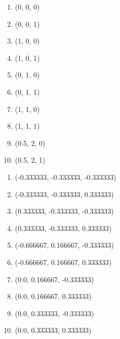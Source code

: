 \documentclass[10pt]{report}
\begin{document}
\begin{center}
    \begin{enumerate}[v]
        \item (0, 0, 0)
        \item (0, 0, 1)
        \item (1, 0, 0)
        \item (1, 0, 1)
        \item (0, 1, 0)
        \item (0, 1, 1)
        \item (1, 1, 0)
        \item (1, 1, 1)
        \item (0.5, 2, 0)
        \item (0.5, 2, 1)
    \end{enumerate}     
    \begin{enumerate}[vn]
        \item (-0.333333, -0.333333, -0.333333)
        \item (-0.333333, -0.333333, 0.333333)
        \item (0.333333, -0.333333, -0.333333)
        \item (0.333333, -0.333333, 0.333333)
        \item (-0.666667, 0.166667, -0.333333)
        \item (-0.666667, 0.166667, 0.333333)
        \item (0.0, 0.166667, -0.333333)
        \item (0.0, 0.166667, 0.333333)
        \item (0.0, 0.333333, -0.333333)
        \item (0.0, 0.333333, 0.333333)
    \end{enumerate}  
\end{center}
\end{document}

